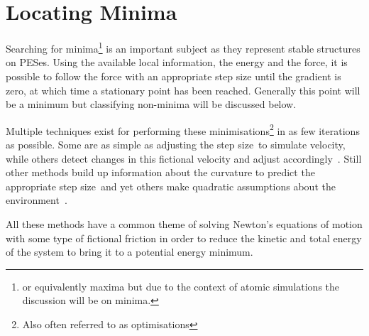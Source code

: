\section{Locating Minima}
\label{sec:minima}

Searching for minima\footnote{or equivalently maxima but due to the context of atomic simulations the discussion will be on minima.} is an important subject as they represent stable structures on PESes.
Using the available local information, the energy and the force, it is possible to follow the force with an appropriate step size until the gradient is zero, at which time a stationary point has been reached.
Generally this point will be a minimum but classifying non-minima will be discussed below.

Multiple techniques exist for performing these minimisations\footnote{Also often referred to as optimisations} in as few iterations as possible.
Some are as simple as adjusting the step size~\citemiss to simulate velocity, while others detect changes in this fictional velocity and adjust accordingly~\citemiss.
Still other methods build up information about the curvature to predict the appropriate step size~\citemiss and yet others make quadratic assumptions about the environment~\citemiss.

All these methods have a common theme of solving Newton's equations of motion with some type of fictional friction in order to reduce the kinetic and total energy of the system to bring it to a potential energy minimum.
